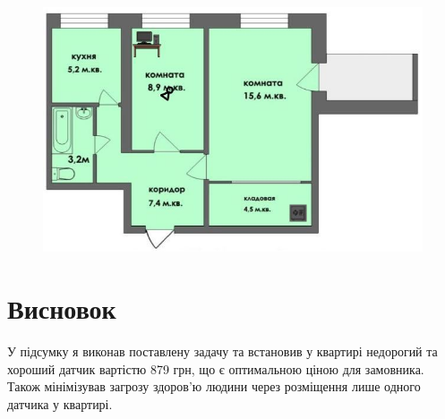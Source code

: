 \begin{figure}[h!]
  \centering
  \includegraphics[width=17cm]{reports/info-protection/lab1/assets/flat-filled.jpeg}
\end{figure}

\section{Висновок}
У підсумку я виконав поставлену задачу та встановив у квартирі недорогий та хороший датчик вартістю 879 грн, що є оптимальною ціною для замовника. Також мінімізував загрозу здоров'ю людини через розміщення лише одного датчика у квартирі.
